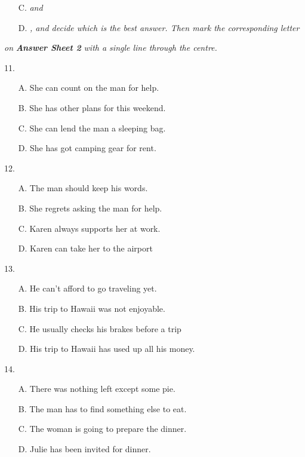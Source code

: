 \documentclass[UTF8,11pt]{ctexart}
\begin{document}
\begin{itemize}[leftmargin=2em,itemsep=.2em,topsep=.4em]\item[C.] \textit{and}
\item[D.] \textit{, and decide which is the best answer. Then mark the corresponding letter}
\end{itemize}

\textit{on}\textbf{\textit{ Answer Sheet 2}}\textit{ with a single line through the centre.}


11.


\begin{itemize}[leftmargin=2em,itemsep=.2em,topsep=.4em]\item[A.] She can count on the man for help.
\item[B.] She has other plans for this weekend.
\item[C.] She can lend the man a sleeping bag.
\item[D.] She has got camping gear for rent.
\end{itemize}

12.


\begin{itemize}[leftmargin=2em,itemsep=.2em,topsep=.4em]\item[A.] The man should keep his words.
\item[B.] She regrets asking the man for help.
\item[C.] Karen always supports her at work.
\item[D.] Karen can take her to the airport
\end{itemize}

13.


\begin{itemize}[leftmargin=2em,itemsep=.2em,topsep=.4em]\item[A.] He can't afford to go traveling yet.
\item[B.] His trip to Hawaii was not enjoyable.
\item[C.] He usually checks his brakes before a trip
\item[D.] His trip to Hawaii has used up all his money.
\end{itemize}

14.


\begin{itemize}[leftmargin=2em,itemsep=.2em,topsep=.4em]\item[A.] There was nothing left except some pie.
\item[B.] The man has to find something else to eat.
\item[C.] The woman is going to prepare the dinner.
\item[D.] Julie has been invited for dinner.
\end{itemize}
\end{document}
